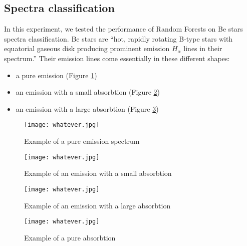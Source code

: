 \documentclass[thesis=B,english]{FITthesis}[2012/10/20]
\begin{document}
\subsection{Spectra classification}
In this experiment, we tested the performance of Random Forests on Be stars spectra classification. Be stars are ``hot, rapidly rotating B-type stars with equatorial gaseous disk producing prominent emission $H_\alpha$ lines in their spectrum.''\cite{bromovabeclass} Their emission lines come essentially in these different shapes:
\begin{itemize}
\item a pure emission (Figure \ref{fig:pure_emission})
\item an emission with a small absorbtion (Figure \ref{fig:small_abs})
\item an emission with a large absorbtion (Figure \ref{fig:large_abs})
\end{itemize}

\begin{figure}

\texttt{[image: whatever.jpg]}
\centering
\caption{Example of a pure emission spectrum}
\label{fig:pure_emission}

\end{figure}

\begin{figure}
\centering
\texttt{[image: whatever.jpg]}
\caption{Example of an emission with a small absorbtion}
\label{fig:small_abs}

\end{figure}

\begin{figure}
\centering
\texttt{[image: whatever.jpg]}
\caption{Example of an emission with a large absorbtion}
\label{fig:large_abs}

\end{figure}
\begin{figure}
\centering
\texttt{[image: whatever.jpg]}
\caption{Example of a pure absorbtion}
\label{fig:pure_absrob}

\end{figure}
\end{document}
